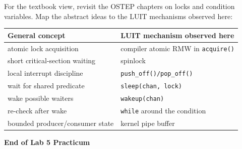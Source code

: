 \documentclass[11pt,a4paper]{article}
\newcommand{\file}[1]{\texttt{#1}}
\begin{document}
For the textbook view, revisit the OSTEP chapters on locks and condition variables. Map the abstract ideas to the LUIT mechanisms observed here:

\begin{center}
\begin{tabularx}{0.96\textwidth}{@{}p{43mm}X@{}}
\toprule
\textbf{General concept} & \textbf{LUIT mechanism observed here} \\
\midrule
atomic lock acquisition & compiler atomic RMW in \file{acquire()} \\
short critical-section waiting & spinlock \\
local interrupt discipline & \file{push\_off()/pop\_off()} \\
wait for shared predicate & \file{sleep(chan, lock)} \\
wake possible waiters & \file{wakeup(chan)} \\
re-check after wake & \file{while} around the condition \\
bounded producer/consumer state & kernel pipe buffer \\
\bottomrule
\end{tabularx}
\end{center}

\vfill
\begin{center}
\textbf{End of Lab 5 Practicum}
\end{center}
\end{document}
